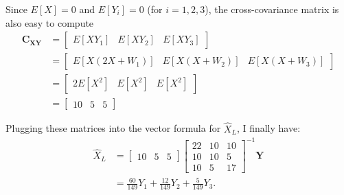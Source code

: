 \begin{problem}{10}
Since $E[X] = 0$ and $E[Y_i]=0$ (for $i=1, 2, 3$), the cross-covariance matrix is also easy to compute
\begin{align*}
\bm{C_{XY}}  &=  \left[\begin{matrix}
    E[XY_1] &E[XY_2] &E[XY_3]  
\end{matrix}\right] \\
&=  \left[\begin{matrix}
    E[X(2X+W_1)] &E[X(X+W_2)] &E[X(X+W_3)]  
\end{matrix}\right] \\
&=  \left[\begin{matrix}
    2E[X^2] & E[X^2]& E[X^2]
\end{matrix}\right] \\
&=  \left[\begin{matrix}
    10 & 5& 5
\end{matrix}\right] 
\end{align*}

Plugging these matrices into the vector formula for $\hat X_L$, I finally have:
\begin{align*}
\hat X_L &=\left[\begin{matrix}
    10 & 5 & 5
\end{matrix}\right] \left[\begin{matrix}
    22 & 10 & 10 \\
    10& 10 & 5 \\
    10 & 5& 17
\end{matrix}\right]^{-1}\bm Y \\
& = \frac{60}{149}Y_1+\frac{12}{149}Y_2+\frac{5}{149}Y_3.
\end{align*}


\end{problem}

